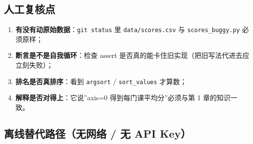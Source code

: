 \begin{Shaded}
\begin{Highlighting}[]
\NormalTok{(}\NormalTok{))}
\NormalTok{(}\OperatorTok{=}\NormalTok{), }\OperatorTok{=}\NormalTok{))}
\OperatorTok{=} \StringTok{ } \OperatorTok{\%}\OperatorTok{{-}}\NormalTok{total)[:}\NormalTok{])}
\NormalTok{(}
\NormalTok{(}\NormalTok{)}
\end{Highlighting}
\end{Shaded}

\begin{Shaded}
\begin{Highlighting}[]
\end{Highlighting}
\end{Shaded}

\subsection{人工复核点}\label{ux4ebaux5de5ux590dux6838ux70b9}

\begin{enumerate}
\def\labelenumi{\arabic{enumi}.}
\tightlist
\item
  \textbf{有没有动原始数据}：\texttt{git\ status} 里
  \texttt{data/scores.csv} 与 \texttt{scores\_buggy.py} 必须原样；
\item
  \textbf{断言是不是自我循环}：检查 assert
  是否真的能卡住旧实现（把旧写法代进去应立刻失败）；
\item
  \textbf{排名是否真排序}：看到 \texttt{argsort} / \texttt{sort\_values}
  才算数；
\item
  \textbf{解释是否对得上}：它说''axis=0 得到每门课平均分''必须与第 1
  章的知识一致。
\end{enumerate}

\subsection{离线替代路径（无网络 / 无 API
Key）}\label{ux79bbux7ebfux66ffux4ee3ux8defux5f84ux65e0ux7f51ux7edc-ux65e0-api-key}

